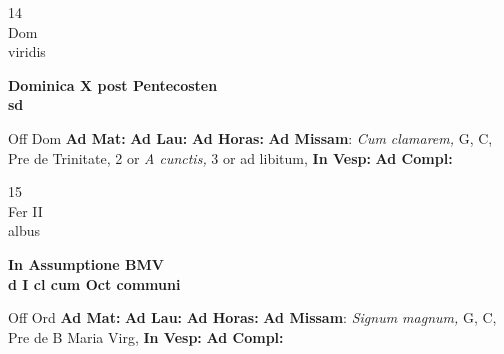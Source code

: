 \documentclass[10pt, openany]{book}
\begin{document}
        \begin{center}
            \begin{minipage}{3.5in}
                \vspace{2em}
                \begin{minipage}{0.5in}
                    {\Huge 14} \\
                    {\normalsize Dom} \\
                    {\normalsize viridis}
                \end{minipage}
                \begin{minipage}{3.0in}
                    \textbf{ \large Dominica X post Pentecosten \\
                    \textnormal{\normalsize sd}} \\ 
                \end{minipage}
                \begin{justify}Off Dom
                    \textbf{Ad Mat: }
                    \textbf{Ad Lau: }
                    \textbf{Ad Horas: }\textbf{Ad Missam}: \textit{Cum clamarem,} G, C, Pre de Trinitate, 2 or \textit{A cunctis,} 3 or ad libitum,  
                    \textbf{In Vesp: }
                    \textbf{Ad Compl: }
                \end{justify}
            \end{minipage}
        \end{center}
    
        \begin{center}
            \begin{minipage}{3.5in}
                \vspace{2em}
                \begin{minipage}{0.5in}
                    {\Huge 15} \\
                    {\normalsize Fer II} \\
                    {\normalsize albus}
                \end{minipage}
                \begin{minipage}{3.0in}
                    \textbf{ \large In Assumptione BMV \\
                    \textnormal{\normalsize d I cl cum Oct communi}} \\ 
                \end{minipage}
                \begin{justify}Off Ord
                    \textbf{Ad Mat: }
                    \textbf{Ad Lau: }
                    \textbf{Ad Horas: }\textbf{Ad Missam}: \textit{Signum magnum,} G, C, Pre de B Maria Virg,  
                    \textbf{In Vesp: }
                    \textbf{Ad Compl: }
                \end{justify}
            \end{minipage}
        \end{center}
    
\end{document}
